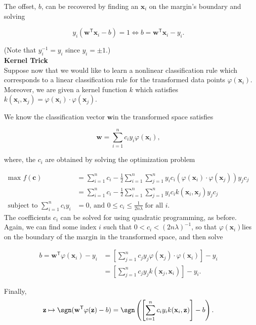 The offset, \(b\), can be recovered by finding an \(\mathbf{x}_i\) on the margin's boundary and solving

\[y_i(\mathbf{w}^\mathsf{T} \mathbf{x}_i - b) = 1 \iff b = \mathbf{w}^\mathsf{T} \mathbf{x}_i - y_i .\]

(Note that \(y_i^{-1}=y_i\) since \(y_i=\pm 1\).)
\\

\textbf{Kernel Trick} \\
Suppose now that we would like to learn a nonlinear classification rule which corresponds to a linear classification rule for the transformed data points \(\varphi(\mathbf{x}_i).\) Moreover, we are given a kernel function \(k\) which satisfies \(k(\mathbf{x}_i, \mathbf{x}_j) = \varphi(\mathbf{x}_i) \cdot \varphi(\mathbf{x}_j)\).

We know the classification vector \(\mathbf{w}\)in the transformed space satisfies

\[\mathbf{w} = \sum_{i=1}^n c_iy_i\varphi(\mathbf{x}_i),\]

where, the \(c_i\) are obtained by solving the optimization problem

\begin{align}
\text{max}\,\, f(\mathbf{c}) &=  \sum_{i=1}^n c_i - \frac 1 2 \sum_{i=1}^n\sum_{j=1}^n y_ic_i(\varphi(\mathbf{x}_i) \cdot \varphi(\mathbf{x}_j))y_jc_j \\
&=  \sum_{i=1}^n c_i - \frac 1 2 \sum_{i=1}^n\sum_{j=1}^n y_ic_ik(\mathbf{x}_i, \mathbf{x}_j)y_jc_j \\
\text{subject to } \sum_{i=1}^n c_i y_i &= 0,\,\text{and } 0 \leq c_i \leq \frac{1}{2n\lambda}\;\text{for all }i.
\end{align}
The coefficients \(c_i\) can be solved for using quadratic programming, as before. Again, we can find some index \(i\) such that \(0 < c_i <(2n\lambda)^{-1}\), so that \(\varphi(\mathbf{x}_i)\)lies on the boundary of the margin in the transformed space, and then solve

\begin{align}
b = \mathbf{w}^\mathsf{T} \varphi(\mathbf{x}_i) - y_i &= \left[\sum_{j=1}^n c_jy_j\varphi(\mathbf{x}_j) \cdot \varphi(\mathbf{x}_i)\right] - y_i \\
  &= \left[\sum_{j=1}^n c_jy_jk(\mathbf{x}_j, \mathbf{x}_i)\right] - y_i.
\end{align}

Finally,
\[\mathbf{z} \mapsto \sgn(\mathbf{w}^\mathsf{T} \varphi(\mathbf{z}) - b) = \sgn \left(\left[\sum_{i=1}^n c_iy_ik(\mathbf{x}_i, \mathbf{z})\right] - b\right).\]
\\
